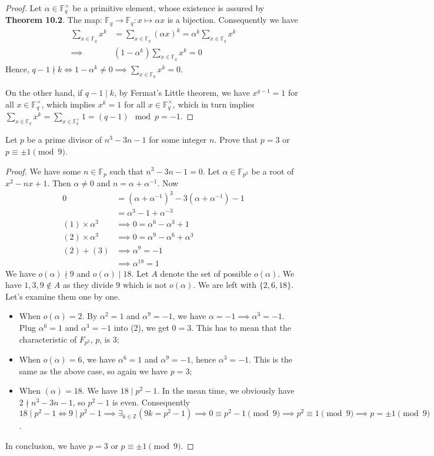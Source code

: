 \documentclass[12pt,letterpaper]{article}
\def\Z{{\mathbb Z}}
\def\F{{\mathbb F}}
\def\prob#1{\vskip13pt\noindent\llap{{\bf #1:\ }}}
\begin{document}
\begin{proof}
	Let $\alpha\in \F_q^\times$ be a primitive element, whose existence is assured by \textbf{Theorem 10.2}. The map: $\F_q \to \F_q : x\mapsto \alpha x$ is a bijection. Consequently we have\begin{align*}
		\sum_{x\in \F_q}x^k &=\sum_{x\in \F_q}(\alpha x)^k=\alpha^k\sum_{x\in \F_q}x^k\\
		\implies &(1-\alpha^k)\sum_{x\in \F_q}x^k=0
	\end{align*}
	Hence, $\displaystyle q-1 \nmid k \iff 1-\alpha^k\ne0\implies \sum_{x\in \F_q}x^k=0.$
	
	On the other hand, if $q-1 \mid k$, by Fermat's Little theorem, we have $x^{q-1}=1$ for all $x\in \F_q^\times$, which implies $x^k=1$ for all $x\in\F_q^\times$, which in turn implies $\displaystyle \sum_{x\in \F_q}x^k=\sum_{x\in \F_q^\times}1=(q-1)\mod p=-1$.
\end{proof}


\pagebreak

\prob3 Let $p$ be a prime divisor of $n^3 -3n - 1$ for some integer $n$. Prove that $p = 3$ or $p\equiv \pm1\pmod{9}$.

\begin{proof}
	We have some $n\in\F_p$ such that $n^3-3n-1=0$. Let $\alpha\in\F_{p^2}$ be a root of $x^2-nx+1$. Then $\alpha\ne 0$ and $n=\alpha+\alpha^{-1 }$. Now\begin{align*}
		0 &= (\alpha+\alpha^{-1})^3-3(\alpha+\alpha^{-1})-1\\
		 &=\alpha^3-1 + \alpha^{-3}\tag{1}\\
		(1)\times \alpha^3&\implies
		 	0 =\alpha^6-\alpha^3+1\tag{2}\\
		(2)\times \alpha^3 &\implies 	0 =\alpha^9-\alpha^6+\alpha^3\tag{3} \\
		(2)+(3) & \implies \alpha^9=-1\tag{4}\\
		&\implies \alpha^{18}=1
	\end{align*}
We have $o(\alpha)\nmid 9$ and $o(\alpha)\mid 18$. Let $A$ denote the set of possible $o(\alpha)$. We have $1,3,9\notin A$ as they divide $9$ which is not $o(\alpha)$. We are left with $\{2,6,18\}$. Let's examine them one by one.
\begin{itemize}
	\item When $o(\alpha)=2$. By $\alpha^2=1$ and $\alpha^9=-1$, we have $\alpha=-1\implies \alpha^3=-1$. Plug $\alpha^6=1$ and $\alpha^3=-1$ into (2), we get $0=3$. This has to mean that the characteristic of $F_{p^2}$, $p$, is $3$;
	\item When $o(\alpha)=6$, we have $\alpha^6=1$ and $\alpha^9=-1$, hence $\alpha^3=-1$. This is the same as the above case, so again we have $p=3$;
	\item When $(\alpha)=18$. We have $18 \mid p^2-1$. In the mean time, we obviously have $2\nmid n^3-3n-1$, so $p^2-1$ is even. Consequently $18\mid p^2-1\iff 9\mid p^2-1\implies \exists_{k\in\Z}(9k=p^2-1)\implies 0\equiv p^2-1 \pmod{9}\implies p^2\equiv 1\pmod{9}\implies p=\pm 1\pmod{9}$. 
\end{itemize}

In conclusion, we have $p=3$ or $p\equiv\pm1\pmod{9}$.

\end{proof}
\end{document}
